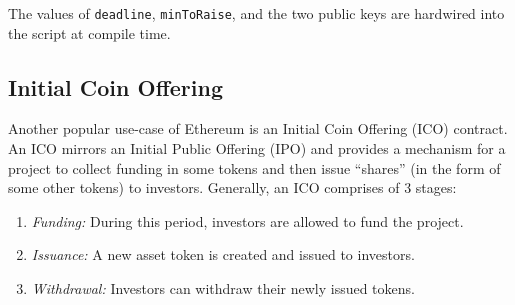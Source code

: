 \documentclass[runningheads]{llncs}
\begin{document}
The values of \texttt{deadline}, \texttt{minToRaise}, and the two public keys are hardwired into the script at compile time.
 
\subsection{Initial Coin Offering}
\label{ico}

Another popular use-case of Ethereum is an Initial Coin Offering (ICO) contract. %
An ICO mirrors an Initial Public Offering (IPO) and provides a mechanism for a project to collect funding in some tokens and then issue ``shares'' (in the form of some other tokens) to investors. Generally, an ICO comprises of 3 stages:
\begin{enumerate}
	\item {\em Funding:} During this period, investors are allowed to fund the project.
	\item {\em Issuance:} A new asset token is created and issued to investors.
	\item {\em Withdrawal:} Investors can withdraw their newly issued tokens. 
\end{enumerate}
\end{document}
